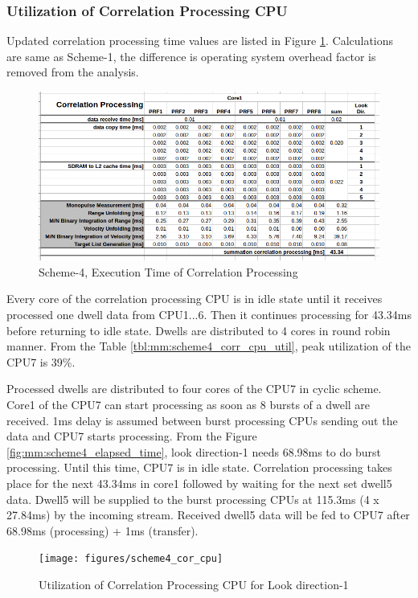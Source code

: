 \subsubsection{Utilization of Correlation Processing CPU}
\label{mm:SSS:scheme4:corr_cpu_util}
Updated correlation processing time values are listed in Figure \ref{fig:mm:scheme4_corr_calc}. Calculations are same as Scheme-1, the difference is operating system overhead factor is removed from the analysis.
\begin{figure}[h!]
	\centering
	\includegraphics[width=160mm]{figures/scheme4_corr_proc}
	\caption{Scheme-4, Execution Time of Correlation Processing}
	\label{fig:mm:scheme4_corr_calc}
\end{figure}

Every core of the correlation processing CPU is in idle state until it receives processed one dwell data from CPU1...6. Then it continues processing for 43.34ms before returning to idle state. Dwells are distributed to 4 cores in round robin manner. From the Table \ref{tbl:mm:scheme4_corr_cpu_util}, peak utilization of the CPU7 is 39\%. 

Processed dwells are distributed to four cores of the CPU7 in cyclic scheme. Core1 of the CPU7 can start processing as soon as 8 bursts of a dwell are received. 1ms delay is assumed between burst processing CPUs sending out the data and CPU7 starts processing. From the Figure \ref{fig:mm:scheme4_elapsed_time}, look direction-1 needs 68.98ms to do burst processing. Until this time, CPU7 is in idle state. Correlation processing takes place for the next 43.34ms in core1 followed by waiting for the next set dwell5 data. Dwell5 will be supplied to the burst processing CPUs at 115.3ms (4 x 27.84ms) by the incoming stream. Received dwell5 data will be fed to CPU7 after 68.98ms (processing) + 1ms (transfer).

\begin{figure}[h!]
	\centering
	\texttt{[image: figures/scheme4\_cor\_cpu]}
	\caption{Utilization of Correlation Processing CPU for Look direction-1}
	\label{fig:mm:scheme4_corr_cpu_util}
\end{figure}

